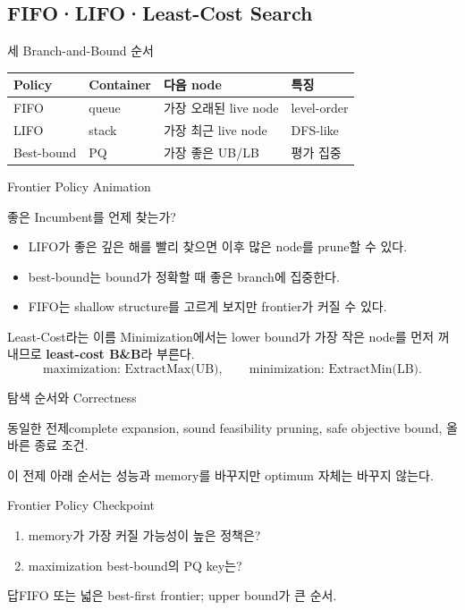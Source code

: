 \subsection{FIFO·LIFO·Least-Cost Search}
\begin{frame}{세 Branch-and-Bound 순서 \hfill \ssoptional[선택 심화]}
\small\begin{tabular}{llll}\toprule
Policy&Container&다음 node&특징\\\midrule
FIFO&queue&가장 오래된 live node&level-order\\
LIFO&stack&가장 최근 live node&DFS-like\\
Best-bound&PQ&가장 좋은 UB/LB&평가 집중\\\bottomrule
\end{tabular}
\end{frame}
\begin{frame}{Frontier Policy Animation}
\centering{}
\end{frame}
\begin{frame}{좋은 Incumbent를 언제 찾는가?}
\begin{itemize}
\item LIFO가 좋은 깊은 해를 빨리 찾으면 이후 많은 node를 prune할 수 있다.
\item best-bound는 bound가 정확할 때 좋은 branch에 집중한다.
\item FIFO는 shallow structure를 고르게 보지만 frontier가 커질 수 있다.
\end{itemize}
\end{frame}
\begin{frame}{Least-Cost라는 이름}
Minimization에서는 lower bound가 가장 작은 node를 먼저 꺼내므로 \textbf{least-cost B\&B}라 부른다.
\[
\text{maximization: ExtractMax(UB)},\qquad
\text{minimization: ExtractMin(LB)}.
\]
\end{frame}
\begin{frame}{탐색 순서와 Correctness}
\begin{block}{동일한 전제}complete expansion, sound feasibility pruning, safe objective bound, 올바른 종료 조건.\end{block}
이 전제 아래 순서는 성능과 memory를 바꾸지만 optimum 자체는 바꾸지 않는다.
\end{frame}
\begin{frame}{Frontier Policy Checkpoint}
\begin{enumerate}\item memory가 가장 커질 가능성이 높은 정책은?\item maximization best-bound의 PQ key는?\end{enumerate}
\begin{exampleblock}{답}FIFO 또는 넓은 best-first frontier; upper bound가 큰 순서.\end{exampleblock}
\end{frame}
